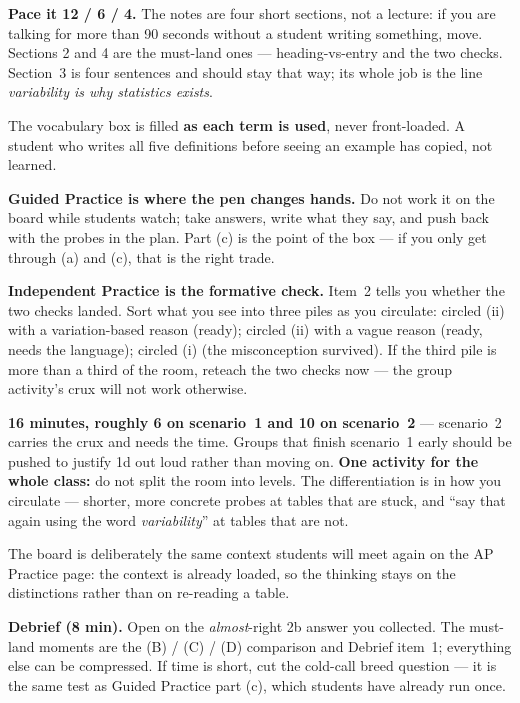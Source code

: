 \documentclass[10pt]{article}
\begin{document}
\begin{teachernote}
\textbf{Pace it 12 / 6 / 4.} The notes are four short sections, not a lecture: if you are talking
for more than 90 seconds without a student writing something, move. Sections 2 and 4 are the
must-land ones --- heading-vs-entry and the two checks. Section~3 is four sentences and should
stay that way; its whole job is the line \emph{variability is why statistics exists}.

The vocabulary box is filled \textbf{as each term is used}, never front-loaded. A student who
writes all five definitions before seeing an example has copied, not learned.

\textbf{Guided Practice is where the pen changes hands.} Do not work it on the board while
students watch; take answers, write what they say, and push back with the probes in the plan.
Part (c) is the point of the box --- if you only get through (a) and (c), that is the right trade.

\textbf{Independent Practice is the formative check.} Item~2 tells you whether the two checks
landed. Sort what you see into three piles as you circulate: circled (ii) with a
variation-based reason (ready); circled (ii) with a vague reason (ready, needs the language);
circled (i) (the misconception survived). If the third pile is more than a third of the room,
reteach the two checks now --- the group activity's crux will not work otherwise.
\end{teachernote}

\begin{teachernote}
\textbf{16 minutes, roughly 6 on scenario~1 and 10 on scenario~2} --- scenario~2 carries the crux
and needs the time. Groups that finish scenario~1 early should be pushed to justify 1d out loud
rather than moving on. \textbf{One activity for the whole class:} do not split the room into
levels. The differentiation is in how you circulate --- shorter, more concrete probes at tables
that are stuck, and ``say that again using the word \emph{variability}'' at tables that are not.

The board is deliberately the same context students will meet again on the AP Practice page: the
context is already loaded, so the thinking stays on the distinctions rather than on re-reading a
table.

\textbf{Debrief (8 min).} Open on the \emph{almost}-right 2b answer you collected. The must-land
moments are the (B) / (C) / (D) comparison and Debrief item~1; everything else can be compressed.
If time is short, cut the cold-call breed question --- it is the same test as Guided Practice
part (c), which students have already run once.
\end{teachernote}
\end{document}
